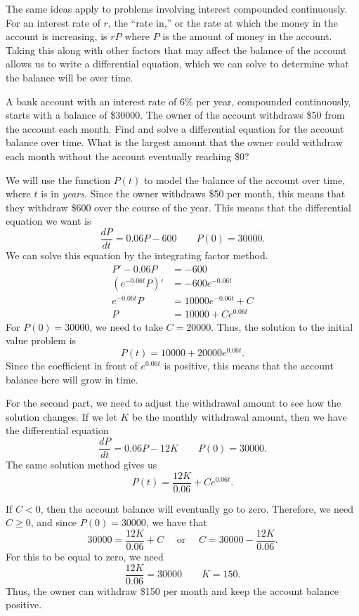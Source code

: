 The same ideas apply to problems involving interest compounded continuously. For an interest rate of $r$, the ``rate in,'' or the rate at which the money in the account is increasing, is $rP$ where $P$ is the amount of money in the account. Taking this along with other factors that may affect the balance of the account allows us to write a differential equation, which we can solve to determine what the balance will be over time.

\begin{example}
A bank account with an interest rate of $6\%$ per year, compounded continuously, starts with a balance of \$30000. The owner of the account withdraws \$50 from the account each month. Find and solve a differential equation for the account balance over time. What is the largest amount that the owner could withdraw each month without the account eventually reaching \$0?
\end{example}

\begin{exampleSol}
We will use the function $P(t)$ to model the balance of the account over time, where $t$ is in \emph{years}. Since the owner withdraws \$50 per month, this means that they withdraw \$600 over the course of the year. This means that the differential equation we want is
\[ \frac{dP}{dt} = 0.06P - 600 \qquad P(0) = 30000. \]
We can solve this equation by the integrating factor method.
\[
\begin{split}
P' - 0.06P &= -600 \\
(e^{-0.06t}P)' &= -600e^{-0.06t} \\
e^{-0.06t}P &= 10000e^{-0.06t} + C \\
P &= 10000 + Ce^{0.06t}
\end{split}
\]
For $P(0) = 30000$, we need to take $C = 20000$. Thus, the solution to the initial value problem is 
\[ P(t) = 10000 + 20000e^{0.06 t}. \] Since the coefficient in front of $e^{0.06t}$ is positive, this means that the account balance here will grow in time. 

For the second part, we need to adjust the withdrawal amount to see how the solution changes. If we let $K$ be the monthly withdrawal amount, then we have the differential equation \[ \frac{dP}{dt} = 0.06P - 12K \qquad P(0) = 30000. \] The same solution method gives us
\[ P(t) = \frac{12K}{0.06} + Ce^{0.06t}. \]

If $C < 0$, then the account balance will eventually go to zero. Therefore, we need $C \geq 0$, and since $P(0) = 30000$, we have that
\[ 30000 = \frac{12K}{0.06} + C \quad \text{ or } \quad C = 30000 - \frac{12K}{0.06}. \] For this to be equal to zero, we need
\[ \frac{12K}{0.06} = 30000 \qquad K = 150. \] Thus, the owner can withdraw \$150 per month and keep the account balance positive.
\end{exampleSol}

